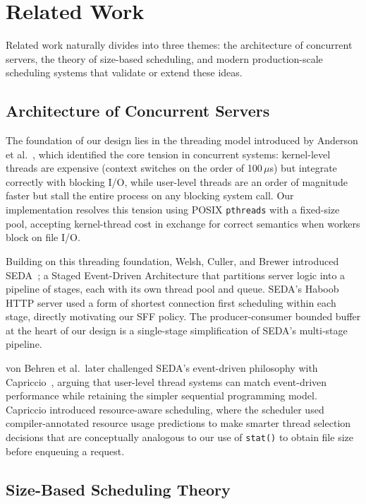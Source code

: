 \documentclass[conference]{IEEEtran}
\begin{document}
\section{Related Work}
\label{sec:related}

Related work naturally divides into three themes: the architecture of
concurrent servers, the theory of size-based scheduling, and modern
production-scale scheduling systems that validate or extend these ideas.

\subsection{Architecture of Concurrent Servers}

The foundation of our design lies in the threading model introduced by
Anderson et al.~\cite{anderson1992}, which identified the core tension in
concurrent systems: kernel-level threads are expensive (context switches on
the order of 100\,$\mu$s) but integrate correctly with blocking I/O, while
user-level threads are an order of magnitude faster but stall the entire
process on any blocking system call. Our implementation resolves this tension
using POSIX \texttt{pthreads} with a fixed-size pool, accepting kernel-thread
cost in exchange for correct semantics when workers block on file I/O.

Building on this threading foundation, Welsh, Culler, and Brewer introduced
SEDA~\cite{welsh2001}; a Staged Event-Driven Architecture that partitions
server logic into a pipeline of stages, each with its own thread pool and
queue. SEDA's Haboob HTTP server used a form of shortest connection first
scheduling within each stage, directly motivating our SFF policy. The
producer-consumer bounded buffer at the heart of our design is a single-stage
simplification of SEDA's multi-stage pipeline.

von Behren et al.\ later challenged SEDA's event-driven philosophy with
Capriccio~\cite{vonbehren2003}, arguing that user-level thread systems can
match event-driven performance while retaining the simpler sequential
programming model. Capriccio introduced resource-aware scheduling, where the
scheduler used compiler-annotated resource usage predictions to make smarter thread selection decisions that are conceptually analogous to our use of
\texttt{stat()} to obtain file size before enqueuing a request.

\subsection{Size-Based Scheduling Theory}
\end{document}
